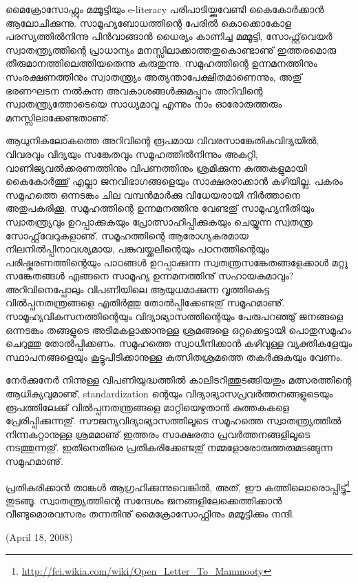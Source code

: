 ﻿
\enlargethispage{2\baselineskip}
\vskip 2pt

മൈക്രോസോഫ്റ്റും മമ്മൂട്ടിയും e-literacy പരിപാടിയ്ക്കുവേണ്ടി കൈകോര്‍ക്കാന്‍ ആലോചിക്കുന്നു. 
സാമൂഹ്യബോധത്തിന്റെ പേരില്‍ കൊക്കൊകോള പരസ്യത്തില്‍നിന്നു പിന്‍വാങ്ങാന്‍ ധൈര്യം കാണിച്ച മമ്മൂട്ടി, 
സോഫ്റ്റ്‌വെയര്‍ സ്വാതന്ത്ര്യത്തിന്റെ പ്രാധാന്യം മനസ്സിലാക്കാത്തതുകൊണ്ടാണു് ഇത്തരമൊരു തീരുമാനത്തിലെത്തിയതെന്നു 
കരുതുന്നു. സമൂഹത്തിന്റെ ഉന്നമനത്തിനും സംരക്ഷണത്തിനും സ്വാതന്ത്ര്യം അത്യന്താപേക്ഷിതമാണെന്നും, അതു് ഭരണഘടന 
നല്‍കുന്ന അവകാശങ്ങള്‍ക്കുമപ്പുറം അറിവിന്റെ സ്വാതന്ത്ര്യത്തോടെയെ സാധ്യമാവൂ എന്നും നാം ഓരോരുത്തരും 
മനസ്സിലാക്കേണ്ടതാണു്.

ആധുനികലോകത്തെ അറിവിന്റെ രൂപമായ വിവരസാങ്കേതികവിദ്യയില്‍, വിവരവും വിദ്യയും സങ്കേതവും സമൂഹത്തില്‍നിന്നും അകറ്റി, 
വാണിജ്യവല്‍ക്കരണത്തിനും വിപണത്തിനും ശ്രമിക്കുന്ന കുത്തകളുമായി കൈകോര്‍ത്തു് എല്ലാ ജനവിഭാഗങ്ങളെയും 
സാക്ഷരരാക്കാന്‍ കഴിയില്ല. പകരം സമൂഹത്തെ ഒന്നടങ്കം ചില വമ്പന്‍മാര്‍ക്കു വിധേയരായി നിര്‍ത്താനെ അതുപകരിക്കൂ. 
സമൂഹത്തിന്റെ ഉന്നമനത്തിനു വേണ്ടതു് സാമൂഹ്യനീതിയും സ്വാതന്ത്ര്യവും ഉറപ്പാക്കുകയും പ്രോത്സാഹിപ്പിക്കുകയും 
ചെയ്യുന്ന സ്വതന്ത്ര സോഫ്റ്റ്‌വേറുകളാണു്. സമൂഹത്തിന്റെ ആരോഗ്യകരമായ നിലനില്‍പ്പിനാവശ്യമായ, പങ്കുവയ്ക്കലിന്റെയും 
പഠനത്തിന്റെയും പരിഷ്കരണത്തിന്റെയും പാഠങ്ങള്‍ ഉറപ്പാക്കുന്ന സ്വതന്ത്രസങ്കേതങ്ങളേക്കാള്‍ മറ്റു സങ്കേതങ്ങള്‍ എങ്ങനെ 
സാമൂഹ്യ ഉന്നമനത്തിനു് സഹായകമാവും? അറിവിനെപ്പോലും വിപണിയിലെ ആയുധമാക്കുന്ന വൃത്തികെട്ട വില്‍പ്പനതന്ത്രങ്ങളെ 
എതിര്‍ത്തു തോല്‍പ്പിക്കേണ്ടതു് സമൂഹമാണു്. സാമൂഹ്യവികസനത്തിന്റെയും വിദ്യാഭ്യാസത്തിന്റെയും പേരുപറഞ്ഞു് 
ജനങ്ങളെ ഒന്നടങ്കം തങ്ങളുടെ അടിമകളാക്കാനുള്ള ശ്രമങ്ങളെ ഒറ്റക്കെട്ടായി പൊതുസമൂഹം ചെറുത്തു തോല്‍പ്പിക്കണം. 
സമൂഹത്തെ സ്വാധീനിക്കാന്‍ കഴിവുള്ള വ്യക്തികളേയും സ്ഥാപനങ്ങളെയും കൂട്ടുപിടിക്കാനുള്ള കുത്സിതശ്രമത്തെ 
തകര്‍ക്കുകയും വേണം.

നേര്‍ക്കുനേര്‍ നിന്നുള്ള വിപണിയുദ്ധത്തില്‍ കാലിടറിത്തുടങ്ങിയതും മത്സരത്തിന്റെ ആധിക്യവുമാണു്, standardization ന്റെയും 
വിദ്യാഭ്യാസപ്രവര്‍ത്തനങ്ങളുടെയും രൂപത്തിലേക്കു് വില്‍പ്പനതന്ത്രങ്ങളെ മാറ്റിയെഴുതാന്‍ കുത്തകകളെ പ്രേരിപ്പിക്കുന്നതു്. 
 സൗജന്യവിദ്യാഭ്യാസത്തിലൂടെ സമൂഹത്തെ സ്വാതന്ത്ര്യത്തില്‍ നിന്നകറ്റാനുള്ള ശ്രമമാണു് ഇത്തരം സാക്ഷരതാ 
പ്രവര്‍ത്തനങ്ങളിലൂടെ നടത്തുന്നതു്. ഇതിനെതിരെ പ്രതികരിക്കേണ്ടതു് നമ്മളോരോരുത്തരുമടങ്ങുന്ന സമൂഹമാണു്.

\vskip 2pt

പ്രതികരിക്കാന്‍ താങ്കള്‍ ആഗ്രഹിക്കുന്നുവെങ്കില്‍, അത്, 
ഈ കത്തിലൊരൊപ്പിട്ടു്\footnote{\url{http://fci.wikia.com/wiki/Open_Letter_To_Mammooty}} തുടങ്ങൂ. 
സ്വാതന്ത്ര്യത്തിന്റെ സന്ദേശം ജനങ്ങളിലേക്കെത്തിക്കാന്‍ വീണ്ടുമൊരവസരം തന്നതിനു് മൈക്രോസോഫ്റ്റിനും മമ്മൂട്ടിക്കും നന്ദി.

\hspace*{2em}(April 18, 2008)
\newpage
